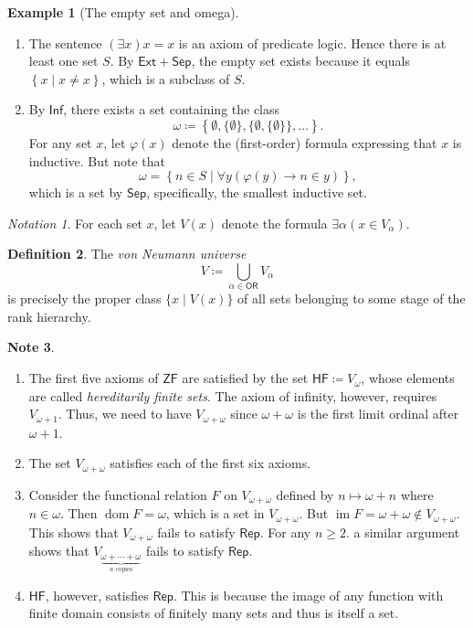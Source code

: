 \documentclass[10pt,letterpaper,cm]{nupset}
\theoremstyle{definition}
\newtheorem{definition}{Definition}[subsection]
\newtheorem{exmp}[definition]{Example}
\newtheorem{note}[definition]{Note}
\theoremstyle{theorem}
\theoremstyle{remark}
\newtheorem*{notation}{Notation}
\newcommand{\1}{\mathbf{1}}
\newcommand{\0}{\vec 0}
\newcommand{\zf}{\mathsf{ZF}}
\newcommand{\ord}{\mathsf{OR}}
\DeclareMathOperator{\im}{im}
\DeclareMathOperator{\dom}{dom}
\begin{document}
\begin{exmp}[The empty set and omega] $ $
\begin{enumerate} 
\item The sentence ${(\exists x)x=x}$ is an axiom of predicate logic. Hence there is at least one set $S$. By $\mathsf{Ext} +\mathsf{Sep}$, the empty set exists because it equals $\left\{x \mid x \ne x\right\}$, which is a subclass of $S$. 
\item By $\mathsf{Inf}$, there exists a set containing the class $$\omega  \coloneqq \left\{\emptyset, \{\emptyset\},  \{ \emptyset, \{\emptyset\}\}, \ldots \right\}.$$ For any set $x$, let $\varphi(x)$ denote the (first-order) formula expressing that $x$ is inductive. But note that $$\omega = \left\{n \in S \mid \forall y(\varphi(y)\rightarrow n \in y)  \right\},$$ which is a set by $\mathsf{Sep}$, specifically, the smallest inductive set.
\end{enumerate}
\end{exmp} 
 
 
 \begin{notation}
For each set $x$, let $V(x)$ denote the formula ${\exists \alpha(x\in V_{\alpha})}$.
\end{notation}

\begin{definition}
The \textit{von Neumann universe} $$V \coloneqq \bigcup_{\alpha \in \ord}V_{\alpha}$$ is precisely the proper class $ \{x \mid V(x)\}$ of all sets  belonging to some stage of the rank hierarchy. 
\end{definition}
 
 \begin{note} $ $
 \begin{enumerate}
 \item The first five axioms  of $\zf$ are satisfied by the set $\mathsf{HF}\coloneqq V_{\omega}$, whose elements are called \textit{hereditarily finite sets}. The axiom of infinity, however, requires $V_{\omega +1}$. Thus, we need to have $V_{\omega + \omega}$ since $\omega + \omega$ is the first limit ordinal after $\omega +1$.
 \item The set $V_{\omega +\omega}$ satisfies each of the first six axioms. 
 \item Consider the functional relation $F$ on $V_{\omega +\omega}$ defined by $n \mapsto \omega + n$ where $n \in \omega$. Then $\dom{F} = \omega$, which is a set in $V_{\omega +\omega}$. But $\im{F} = \omega + \omega \notin V_{\omega + \omega}$. This shows that $V_{\omega +\omega}$ fails to satisfy $\mathsf{Rep}$. For any $n\geq 2$. a similar argument shows that $V_{\underbrace{\omega + \cdots + \omega}_{n \text{ copies}}}$ fails to satisfy $\mathsf{Rep}$.
 \item $\mathsf{HF}$, however, satisfies  $\mathsf{Rep}$. This is because the image of any function  with  finite domain consists of finitely many sets and thus is itself a set. 
 \end{enumerate}
\end{note}
\end{document}
